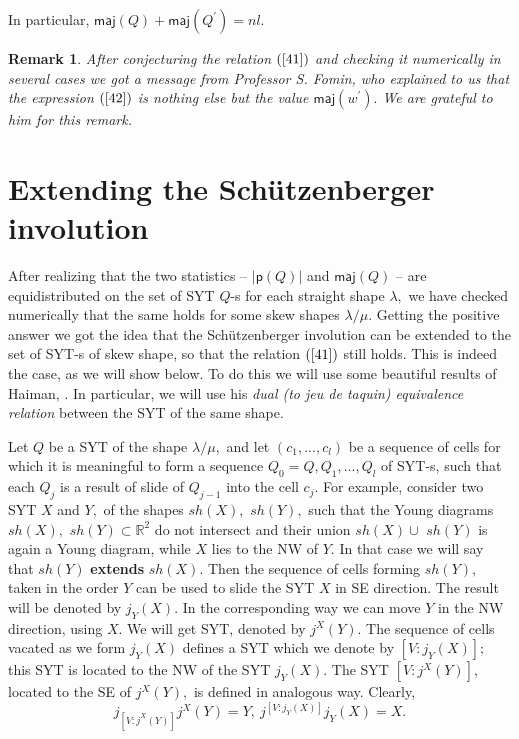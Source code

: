 \documentclass[12pt]{article}%
\newtheorem{remark}[theorem]{Remark}
\begin{document}
In particular, $\mathsf{maj}\left(  Q\right)  +\mathsf{maj}\left(  Q^{\prime
}\right)  =nl.$

\begin{remark}
After conjecturing the relation $\left(  \ref{41}\right)  $ and checking it
numerically in several cases we got a message from Professor S. Fomin, who
explained to us that the expression $\left(  \ref{42}\right)  $ is nothing
else but the value $\mathsf{maj}\left(  w^{\prime}\right)  .$ We are grateful
to him for this remark.
\end{remark}

\section{Extending the Sch\"{u}tzenberger involution}

After realizing that the two statistics -- $\left\vert \mathsf{p}\left(
Q\right)  \right\vert $ and $\mathsf{maj}\left(  Q\right)  $ -- are
equidistributed on the set of SYT $Q$-s for each straight shape $\lambda,$ we
have checked numerically that the same holds for some skew shapes $\lambda
/\mu.$ Getting the positive answer we got the idea that the Sch\"{u}tzenberger
involution can be extended to the set of SYT-s of skew shape, so that the
relation $\left(  \ref{41}\right)  $ still holds. This is indeed the case, as
we will show below. To do this we will use some beautiful results of Haiman,
\cite{H}. In particular, we will use his \textit{dual (to jeu de taquin)
equivalence relation }between the SYT of the same shape.

Let $Q$ be a SYT of the shape $\lambda/\mu,$ and let $\left(  c_{1}%
,...,c_{l}\right)  $ be a sequence of cells for which it is meaningful to form
a sequence $Q_{0}=Q,Q_{1},...,Q_{l}$ of SYT-s, such that each $Q_{j}$ is a
result of slide of $Q_{j-1}$ into the cell $c_{j}.$ For example, consider two
SYT $X$ and $Y,$ of the shapes $sh\left(  X\right)  ,$ $sh\left(  Y\right)  ,$
such that the Young diagrams $sh\left(  X\right)  ,$ $sh\left(  Y\right)
\subset\mathbb{R}^{2}$ do not intersect and their union $sh\left(  X\right)
\cup$ $sh\left(  Y\right)  $ is again a Young diagram, while $X$ lies to the
NW of $Y.$ In that case we will say that $sh\left(  Y\right)  $
\textbf{extends} $sh\left(  X\right)  .$ Then the sequence of cells forming
$sh\left(  Y\right)  ,$ taken in the order $Y$ can be used to slide the SYT
$X$ in SE direction. The result will be denoted by $j_{Y}\left(  X\right)  .$
In the corresponding way we can move $Y$ in the NW direction, using $X.$ We
will get SYT, denoted by $j^{X}\left(  Y\right)  .$ The sequence of cells
vacated as we form $j_{Y}\left(  X\right)  $ defines a SYT which we denote by
$\left[  V:j_{Y}\left(  X\right)  \right]  ;$ this SYT is located to the NW of
the SYT $j_{Y}\left(  X\right)  .$ The SYT $\left[  V:j^{X}\left(  Y\right)
\right]  ,$ located to the SE of $j^{X}\left(  Y\right)  ,$ is defined in
analogous way. Clearly,%
\begin{equation}
j_{\left[  V:j^{X}\left(  Y\right)  \right]  }j^{X}\left(  Y\right)
=Y,\ j^{\left[  V:j_{Y}\left(  X\right)  \right]  }j_{Y}\left(  X\right)  =X.
\label{56}%
\end{equation}
\end{document}
